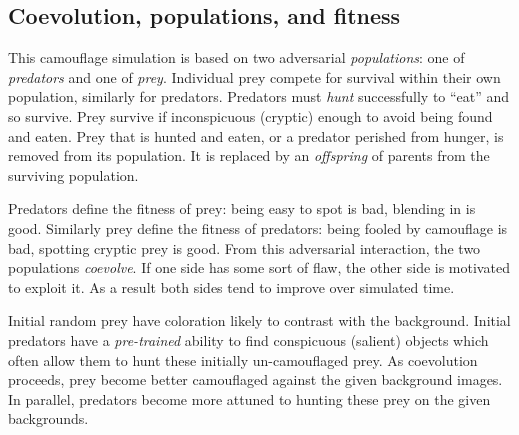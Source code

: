 \documentclass[acmtog]{acmart}
\newcommand{\jargon}[1]{\textit{#1}}
\begin{document}
\subsection{Coevolution, populations, and fitness}
This camouflage simulation is based on two adversarial \jargon{populations}: one of \jargon{predators} and one of \jargon{prey}. Individual prey compete for survival within their own population, similarly for predators. Predators must \jargon{hunt} successfully to “eat” and so survive. Prey survive if inconspicuous (cryptic) enough to avoid being found and eaten. Prey that is hunted and eaten, or a predator perished from hunger, is removed from its population. It is replaced by an \jargon{offspring} of parents from the surviving population.
\par
Predators define the fitness of prey: being easy to spot is bad, blending in is good. Similarly prey define the fitness of predators: being fooled by camouflage is bad, spotting cryptic prey is good. From this adversarial interaction, the two populations \jargon{coevolve}. If one side has some sort of flaw, the other side is motivated to exploit it. As a result both sides tend to improve over simulated time.
\par
Initial random prey have coloration likely to contrast with the background. Initial predators have a \jargon{pre-trained} ability to find conspicuous (salient) objects which often allow them to hunt these initially un-camouflaged prey. As coevolution proceeds, prey become better camouflaged against the given background images. In parallel, predators become more attuned to hunting these prey on the given backgrounds.
\par

\end{document}
